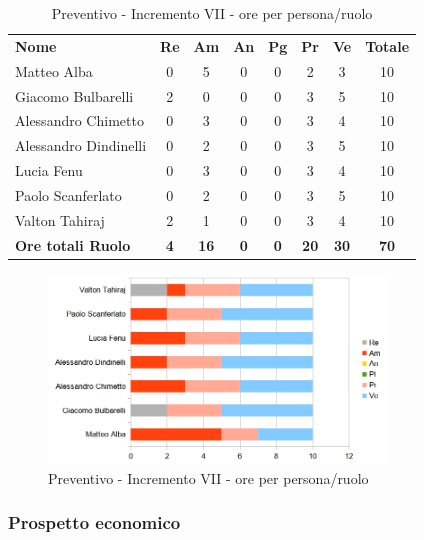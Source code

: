 		\begin{table} [h!]
			\begin{center}
				\begin{tabular} { m{3.5cm} c c c c c c c }
					\rowcolor{lightgray}
					\textbf{Nome} & \textbf{Re} & \textbf{Am} & \textbf{An} & \textbf{Pg} & \textbf{Pr} & \textbf{Ve} & \textbf{Totale} \\
					Matteo Alba & 0 & 5 & 0 & 0 & 2 & 3 & 10 \\
					Giacomo Bulbarelli & 2 & 0 & 0 & 0 & 3 & 5 & 10 \\
					Alessandro Chimetto & 0 & 3 & 0 & 0& 3 & 4 & 10 \\
					Alessandro Dindinelli & 0 & 2 & 0 & 0 & 3 & 5 & 10 \\
					Lucia Fenu & 0 & 3& 0 & 0 & 3 & 4 & 10 \\
					Paolo Scanferlato & 0 & 2 & 0 &0 & 3 & 5 & 10 \\
					Valton Tahiraj & 2 & 1 & 0 & 0 & 3 & 4 & 10 \\
					\textbf{Ore totali Ruolo} & \textbf{4} & \textbf{16} & \textbf{0} & \textbf{0} & \textbf{20}& \textbf{30} & \textbf{70}
				\end{tabular}
				\caption{Preventivo - Incremento VII - ore per persona/ruolo}
			\end{center}
		\end{table}
	
		\begin{figure} [h!]
			\centering
			\includegraphics[width=0.8\textwidth]{res/img/grafici/preventivo-barre- val.png}
			\caption{Preventivo - Incremento VII - ore per persona/ruolo} 
		\end{figure}
	
	\newpage
	
	\subsubsection{Prospetto economico}
	
